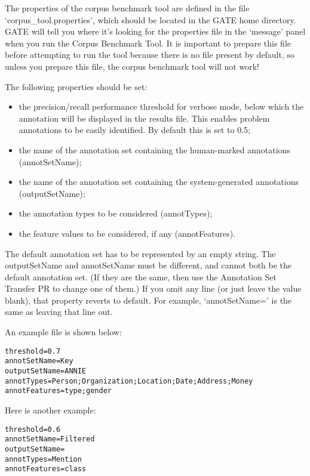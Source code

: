 
The properties of the corpus benchmark tool are defined in the file
`corpus\_tool.properties', which should be located in the GATE home directory. GATE
will tell you where it's looking for the properties file in the `message' panel
when you run the Corpus Benchmark Tool. It is important to prepare this file
before attempting to run the tool because there is no file present by default, so
unless you prepare this file, the corpus benchmark tool will not work!

The following properties should be set:
\begin{itemize}
\item the precision/recall performance threshold for verbose mode, below which
the annotation will be displayed in the results file. This enables problem
annotations to be easily identified. By default this is set to 0.5;
\item the name of the annotation set containing the human-marked
annotations (annotSetName);
\item the name of the annotation set containing the system-generated
annotations (outputSetName);
\item the annotation types to be considered (annotTypes);
\item the feature values to be considered, if any (annotFeatures).
\end{itemize}

The default annotation set has to be represented by an empty string. The
outputSetName and annotSetName must be different, and cannot both be the default
annotation set. (If they are the same, then use the Annotation Set Transfer PR to
change one of them.) If you omit any line (or just leave the value blank), that
property reverts to default. For example, `annotSetName=' is the same as leaving
that line out.

An example file is shown below:
\begin{small}
\begin{verbatim}
threshold=0.7
annotSetName=Key
outputSetName=ANNIE
annotTypes=Person;Organization;Location;Date;Address;Money
annotFeatures=type;gender
\end{verbatim}\end{small}

Here is another example:
\begin{small}
\begin{verbatim}
threshold=0.6  
annotSetName=Filtered  
outputSetName=  
annotTypes=Mention  
annotFeatures=class  
\end{verbatim}\end{small}


